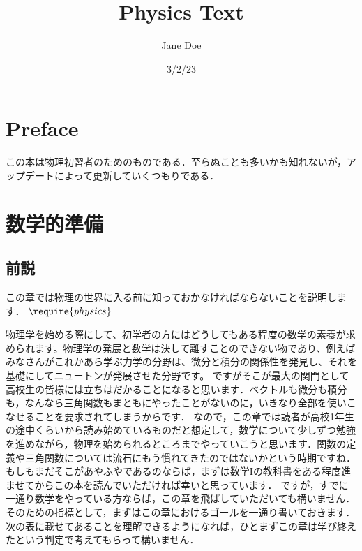 \documentclass[
  letterpaper,
  DIV=11,
  numbers=noendperiod]{scrreprt}
\title{Physics Text}
\author{Jane Doe}
\date{3/2/23}
\renewcommand*\contentsname{Table of contents}
\newcommand\contentsname{Table of contents}
\begin{document}
\maketitle
\ifdefined\Shaded\renewenvironment{Shaded}{\begin{tcolorbox}[interior hidden, boxrule=0pt, frame hidden, borderline west={3pt}{0pt}{shadecolor}, breakable, enhanced, sharp corners]}{\end{tcolorbox}}\fi

\renewcommand*\contentsname{Table of contents}
{
\hypersetup{linkcolor=}
\setcounter{tocdepth}{2}
\tableofcontents
}

\hypertarget{preface}{%
\chapter*{Preface}\label{preface}}


この本は物理初習者のためのものである．至らぬことも多いかも知れないが，アップデートによって更新していくつもりである．


\hypertarget{ux6570ux5b66ux7684ux6e96ux5099}{%
\chapter{数学的準備}\label{ux6570ux5b66ux7684ux6e96ux5099}}

\hypertarget{ux524dux8aac}{%
\section{前説}\label{ux524dux8aac}}

この章では物理の世界に入る前に知っておかなければならないことを説明します．
\(\require{physics}\)

物理学を始める際にして、初学者の方にはどうしてもある程度の数学の素養が求められます。物理学の発展と数学は決して離すことのできない物であり、例えばみなさんがこれかあら学ぶ力学の分野は、微分と積分の関係性を発見し、それを基礎にしてニュートンが発展させた分野です。
ですがそこが最大の関門として高校生の皆様には立ちはだかることになると思います．ベクトルも微分も積分も，なんなら三角関数もまともにやったことがないのに，いきなり全部を使いこなせることを要求されてしまうからです．
なので，この章では読者が高校1年生の途中くらいから読み始めているものだと想定して，数学について少しずつ勉強を進めながら，物理を始められるところまでやっていこうと思います．関数の定義や三角関数については流石にもう慣れてきたのではないかという時期ですね．もしもまだそこがあやふやであるのならば，まずは数学Iの教科書をある程度進ませてからこの本を読んでいただければ幸いと思っています．
ですが，すでに一通り数学をやっている方ならば，この章を飛ばしていただいても構いません．そのための指標として，まずはこの章におけるゴールを一通り書いておきます．次の表に載せてあることを理解できるようになれば，ひとまずこの章は学び終えたという判定で考えてもらって構いません．
\end{document}
